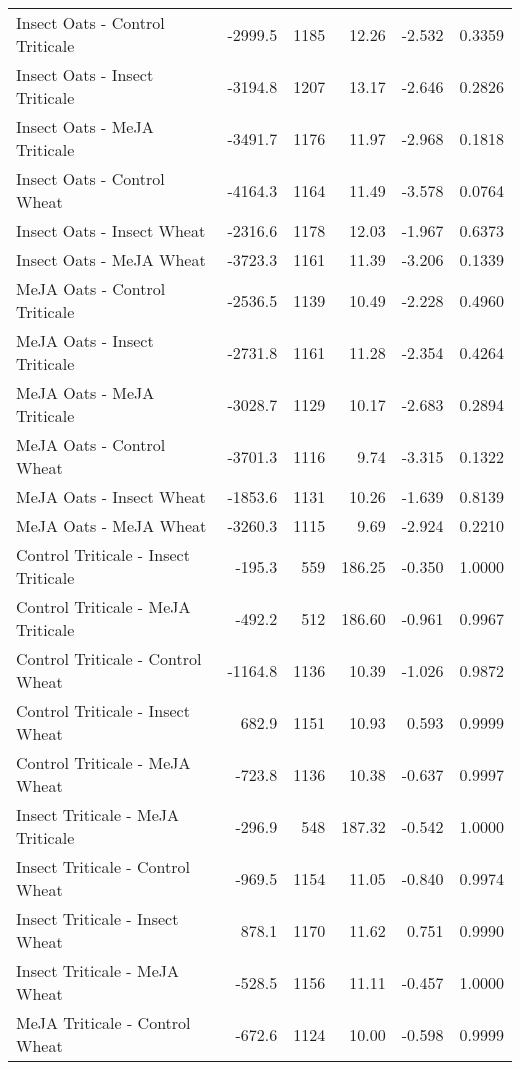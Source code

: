 \begin{table}[ht]
\begin{tabular}{lrrrrr}
        Insect Oats - Control Triticale &-2999.5 &1185 & 12.26 & -2.532 & 0.3359 \\
        Insect Oats - Insect Triticale &-3194.8 &1207 & 13.17 & -2.646 & 0.2826 \\
        Insect Oats - MeJA Triticale &-3491.7 &1176 & 11.97 & -2.968 & 0.1818 \\
        Insect Oats - Control Wheat &-4164.3 &1164 & 11.49 & -3.578 & 0.0764 \\
        Insect Oats - Insect Wheat &-2316.6 &1178 & 12.03 & -1.967 & 0.6373 \\
        Insect Oats - MeJA Wheat &-3723.3 &1161 & 11.39 & -3.206 & 0.1339 \\
        MeJA Oats - Control Triticale &-2536.5 &1139 & 10.49 & -2.228 & 0.4960 \\
        MeJA Oats - Insect Triticale &-2731.8 &1161 & 11.28 & -2.354 & 0.4264 \\
        MeJA Oats - MeJA Triticale &-3028.7 &1129 & 10.17 & -2.683 & 0.2894 \\
        MeJA Oats - Control Wheat &-3701.3 &1116 & 9.74 & -3.315 & 0.1322 \\
        MeJA Oats - Insect Wheat &-1853.6 &1131 & 10.26 & -1.639 & 0.8139 \\
        MeJA Oats - MeJA Wheat &-3260.3 &1115 & 9.69 & -2.924 & 0.2210 \\
        Control Triticale - Insect Triticale & -195.3 & 559 & 186.25 & -0.350 & 1.0000 \\
        Control Triticale - MeJA Triticale & -492.2 & 512 & 186.60 & -0.961 & 0.9967 \\
        Control Triticale - Control Wheat &-1164.8 &1136 & 10.39 & -1.026 & 0.9872 \\
        Control Triticale - Insect Wheat & 682.9 &1151 & 10.93 & 0.593 & 0.9999 \\
        Control Triticale - MeJA Wheat & -723.8 &1136 & 10.38 & -0.637 & 0.9997 \\
        Insect Triticale - MeJA Triticale & -296.9 & 548 & 187.32 & -0.542 & 1.0000 \\
        Insect Triticale - Control Wheat & -969.5 &1154 & 11.05 & -0.840 & 0.9974 \\
        Insect Triticale - Insect Wheat & 878.1 &1170 & 11.62 & 0.751 & 0.9990 \\
        Insect Triticale - MeJA Wheat & -528.5 &1156 & 11.11 & -0.457 & 1.0000 \\
        MeJA Triticale - Control Wheat & -672.6 &1124 & 10.00 & -0.598 & 0.9999 \\

\end{tabular}
\end{table}
